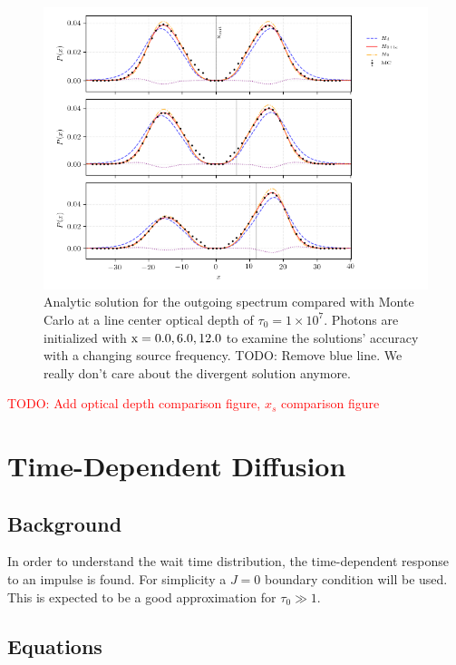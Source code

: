 \documentclass{aastex63}
\newcommand{\todo}[1]{\textcolor{red}{#1}}
\begin{document}
 \begin{figure}
    \centering
    \includegraphics{threepanel_test.png}
    \caption{Analytic solution for the outgoing spectrum compared with Monte Carlo at a line center optical depth of $\tau_0 = 1 \times 10^7$. Photons are initialized with $\rm x = 0.0, 6.0, 12.0$ to examine the solutions' accuracy with a changing source frequency. TODO: Remove blue line. We really don't care about the divergent solution anymore.} 
    \label{fig:sol_mc_xinit}
\end{figure}
 
 \todo{
 TODO: Add optical depth comparison figure, $x_s$ comparison figure
}
\section{Time-Dependent Diffusion}
\label{sec:time_dependent}

\subsection{Background}
\label{subsec:time_dependent:background}

In order to understand the wait time distribution, the time-dependent response to an impulse is found. For simplicity a $J=0$ boundary condition will be used. This is expected to be a good approximation for $\tau_0 \gg 1$. 

\subsection{Equations}
\label{subsec:time_dependent:equations}
\end{document}
